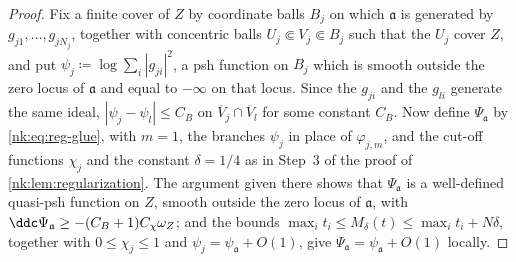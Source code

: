 \begin{proof}
Fix a finite cover of $Z$ by coordinate balls $B_j$ on which
$\mathfrak a$ is generated by $g_{j1},\dots,g_{jN_j}$, together with
concentric balls $U_j\Subset V_j\Subset B_j$ such that the $U_j$ cover
$Z$, and put $\psi_j\coloneqq \log\sum_i|g_{ji}|^2$, a psh function on $B_j$
which is smooth outside the zero locus of $\mathfrak a$ and equal to
$-\infty$ on that locus. Since the $g_{ji}$ and the $g_{li}$ generate the same
ideal, $|\psi_j-\psi_l|\le C_B$ on $\overline V_j\cap\overline V_l$ for
some constant $C_B$. Now define $\Psi_{\mathfrak a}$ by
\eqref{nk:eq:reg-glue}, with $m=1$, the branches $\psi_j$ in place of
$\varphi_{j,m}$, and the cut-off functions $\chi_j$ and the constant
$\delta=1/4$ as in Step~3 of the proof of
\cref{nk:lem:regularization}. The argument given there shows that
$\Psi_{\mathfrak a}$ is a well-defined quasi-psh function on $Z$, smooth
outside the zero locus of $\mathfrak a$, with
$\ddc\Psi_{\mathfrak a}\ge-(C_B+1)C_\chi\omega_Z$; and the bounds
$\max_it_i\le M_\delta(t)\le\max_it_i+N\delta$, together with
$0\le\chi_j\le1$ and $\psi_j=\psi_{\mathfrak a}+O(1)$, give
$\Psi_{\mathfrak a}=\psi_{\mathfrak a}+O(1)$ locally.
\end{proof}

